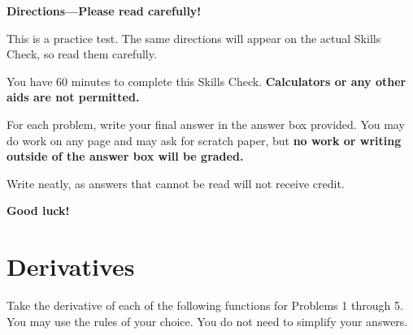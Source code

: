 \documentclass{article}
\begin{document}

{\Large
\begin{center}\textbf{Directions---Please read carefully!} \end{center}}

This is a practice test. The same directions will appear on the actual Skills Check, so read them carefully.

\hrulefill 

You have 60 minutes to complete this Skills Check. \textbf{Calculators or any other aids are not permitted.}  


For each problem, write your final answer in the answer box provided. You may do work on any page and may ask for scratch paper, but \textbf{no work or writing outside of the answer box will be graded.}

Write neatly, as answers that cannot be read will not receive credit. 

   

\begin{center}\textbf{Good luck!}\end{center}


\newpage

\section*{Derivatives}



\noindent Take the derivative of each of the following functions for Problems 1 through 5. You may use the rules of your choice. You do not need to simplify your answers.
\end{document}
